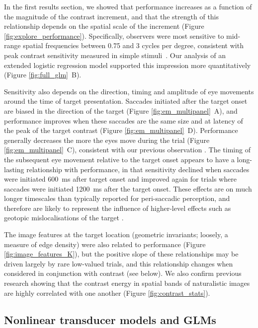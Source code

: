 \documentclass[11pt,a4paper]{article}
\begin{document}
{In the first results section, we showed that performance increases as a function of the magnitude of the contrast increment, and that the strength of this relationship depends on the spatial scale of the increment (Figure \ref{fig:explore_performance}).
Specifically, observers were most sensitive to mid-range spatial frequencies between 0.75 and 3 cycles per degree, consistent with peak contrast sensitivity measured in simple stimuli~\citep{Campbell1968}.
Our analysis of an extended logistic regression model supported this impression more quantitatively (Figure \ref{fig:full_glm}~B).

Sensitivity also depends on the direction, timing and amplitude of eye movements around the time of target presentation.
Saccades initiated after the target onset are biased in the direction of the target (Figure \ref{fig:em_multipanel}~A), and performance improves when these saccades are the same size and at latency of the peak of the target contrast (Figure \ref{fig:em_multipanel}~D).
Performance generally decreases the more the eyes move during the trial (Figure \ref{fig:em_multipanel}~C), consistent with our previous observation \citep{Dorr2013}.
The timing of the subsequent eye movement relative to the target onset appears to have a long-lasting relationship with performance, in that sensitivity declined when saccades were initiated 600~ms after target onset and improved again for trials where saccades were initiated 1200~ms after the target onset.
These effects are on much longer timescales than typically reported for peri-saccadic perception, and therefore are likely to represent the influence of higher-level effects such as geotopic mislocalisations of the target \citep{Dorr2013}. 

The image features at the target location (geometric invariants; loosely, a measure of edge density) were also related to performance (Figure \ref{fig:image_features_K}), but the positive slope of these relationships may be driven largely by rare low-valued trials, and this relationship changes when considered in conjunction with contrast (see below).
We also confirm previous research \citep{Field1987,Simo97,ZeBaWe93a,Balboa2000,Mante2005} showing that the contrast energy in spatial bands of naturalistic images are highly correlated with one another (Figure \ref{fig:contrast_stats}).

\subsection{Nonlinear transducer models and GLMs}

}
\end{document}
